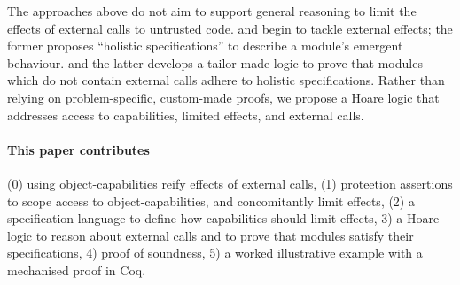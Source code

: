 The approaches above %
do not aim to support
general reasoning to limit the effects of external calls to untrusted code.
\citet{FASE} and \citet{OOPSLA22} begin to tackle external effects; %
the former proposes  ``holistic specifications'' to describe a module's emergent behaviour. 
and the latter develops 
a tailor-made logic to prove that modules which do not contain external calls adhere to holistic specifications.
%
%
Rather than relying on problem-specific, custom-made proofs, we propose a Hoare logic that addresses access to capabilities, limited effects, and external calls.

\paragraph{This paper contributes}
(0) using object-capabilities reify effects of external calls,
{(1) proteetion assertions to scope access to object-capabilities, and concomitantly limit effects}, 
(2) a specification language to define how capabilities should limit effects, %
3) a Hoare logic to reason about external calls and to prove that modules satisfy their %
specifications,
4) proof of soundness,
5) a worked illustrative example {with a mechanised proof in Coq}.
 

